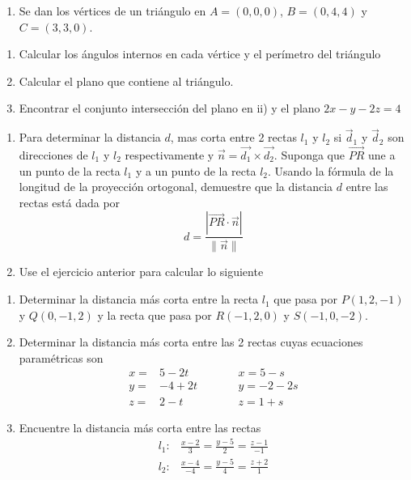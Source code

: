 \documentclass[
]{article}
\providecommand{\tightlist}{%
  \setlength{\itemsep}{0pt}\setlength{\parskip}{0pt}}
\begin{document}
\begin{enumerate}
\def\labelenumi{\arabic{enumi}.}
\setcounter{enumi}{8}
\tightlist
\item
  Se dan los vértices de un triángulo en \(A=(0,0,0)\), \(B=(0,4,4)\) y
  \(C=(3,3,0)\).
\end{enumerate}

\begin{enumerate}
\def\labelenumi{\roman{enumi})}
\item
  Calcular los ángulos internos en cada vértice y el perímetro del
  triángulo
\item
  Calcular el plano que contiene al triángulo.
\item
  Encontrar el conjunto intersección del plano en ii) y el plano
  \(2x-y-2z=4\)
\end{enumerate}

\begin{enumerate}
\def\labelenumi{\arabic{enumi}.}
\setcounter{enumi}{9}
\item
  Para determinar la distancia \(d\), mas corta entre 2 rectas \(l_1\) y
  \(l_2\) si \(\vec{d}_1\) y \(\vec{d}_2\) son direcciones de \(l_1\) y
  \(l_2\) respectivamente y \(\vec{n}=\vec{d_1} \times \vec{d_2}\).
  Suponga que \(\vec{PR}\) une a un punto de la recta \(l_1\) y a un
  punto de la recta \(l_2\). Usando la fórmula de la longitud de la
  proyección ortogonal, demuestre que la distancia \(d\) entre las
  rectas está dada por \[
  d = \frac{|\vec{PR} \cdot \vec{n}|}{\|\vec{n}\|}
  \]
\item
  Use el ejercicio anterior para calcular lo siguiente
\end{enumerate}

\begin{enumerate}
\def\labelenumi{\alph{enumi})}
\item
  Determinar la distancia más corta entre la recta \(l_1\) que pasa por
  \(P(1,2,-1)\) y \(Q(0,-1,2)\) y la recta que pasa por \(R(-1,2,0)\) y
  \(S(-1,0,-2)\).
\item
  Determinar la distancia más corta entre las 2 rectas cuyas ecuaciones
  paramétricas son \[
  \begin{array}{cccc}
  x =& 5-2t & \quad\quad &x = 5-s \\
  y =&-4+2t & \quad\quad &y = -2-2s\\
  z =& 2-t  & \quad\quad &z = 1+s 
  \end{array}
  \]
\item
  Encuentre la distancia más corta entre las rectas \[
  \begin{array}{cc}
  l_1: & \frac{x-2}{3} = \frac{y-5}{2} = \frac{z-1}{-1} \\
  l_2: & \frac{x-4}{-4} = \frac{y-5}{4} = \frac{z+2}{1} 
  \end{array}
  \]
\end{enumerate}
\end{document}
